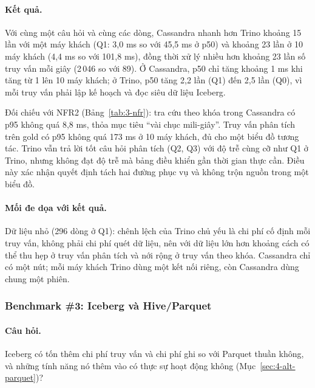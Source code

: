 \paragraph{Kết quả.} Với cùng một câu hỏi và cùng các dòng, Cassandra nhanh hơn Trino khoảng 15 lần với một máy khách (Q1: 3,0 ms so với 45,5 ms ở p50) và khoảng 23 lần ở 10 máy khách (4,4 ms so với 101,8 ms), đồng thời xử lý nhiều hơn khoảng 23 lần số truy vấn mỗi giây (2\,046 so với 89). Ở Cassandra, p50 chỉ tăng khoảng 1 ms khi tăng từ 1 lên 10 máy khách; ở Trino, p50 tăng 2,2 lần (Q1) đến 2,5 lần (Q0), vì mỗi truy vấn phải lập kế hoạch và đọc siêu dữ liệu Iceberg.

Đối chiếu với NFR2 (Bảng~\ref{tab:3-nfr}): tra cứu theo khóa trong Cassandra có p95 không quá 8,8 ms, thỏa mục tiêu ``vài chục mili-giây''. Truy vấn phân tích trên gold có p95 không quá 173 ms ở 10 máy khách, đủ cho một biểu đồ tương tác. Trino vẫn trả lời tốt câu hỏi phân tích (Q2, Q3) với độ trễ cùng cỡ như Q1 ở Trino, nhưng không đạt độ trễ mà bảng điều khiển gần thời gian thực cần. Điều này xác nhận quyết định tách hai đường phục vụ và không trộn nguồn trong một biểu đồ.

\paragraph{Mối đe dọa với kết quả.} Dữ liệu nhỏ (296 dòng ở Q1): chênh lệch của Trino chủ yếu là chi phí cố định mỗi truy vấn, không phải chi phí quét dữ liệu, nên với dữ liệu lớn hơn khoảng cách có thể thu hẹp ở truy vấn phân tích và nới rộng ở truy vấn theo khóa. Cassandra chỉ có một nút; mỗi máy khách Trino dùng một kết nối riêng, còn Cassandra dùng chung một phiên.

\subsubsection{Benchmark \#3: Iceberg và Hive/Parquet}
\label{sec:5-bench-storage}

\paragraph{Câu hỏi.} Iceberg có tốn thêm chi phí truy vấn và chi phí ghi so với Parquet thuần không, và những tính năng nó thêm vào có thực sự hoạt động không (Mục~\ref{sec:4-alt-parquet})?

